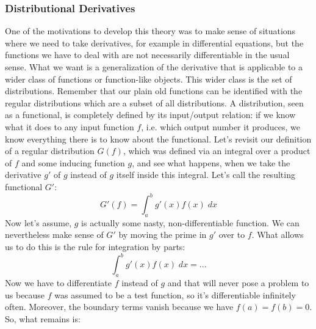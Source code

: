 \subsubsection{Distributional Derivatives}
One of the motivations to develop this theory was to make sense of situations where we need to take derivatives, for example in differential equations, but the functions we have to deal with are not necessarily differentiable in the usual sense. What we want is a generalization of the derivative that is applicable to a wider class of functions or function-like objects. This wider class is the set of distributions. Remember that our plain old functions can be identified with the regular distributions which are a subset of all distributions. A distribution, seen as a functional, is completely defined by its input/output relation: if we know what it does to any input function $f$, i.e. which output number it produces, we know everything there is to know about the functional. Let's revisit our definition of a regular distribution $G(f)$, which was defined via an integral over a product of $f$ and some inducing function $g$, and see what happens, when we take the derivative $g'$ of $g$ instead of $g$ itself inside this integral. Let's call the resulting functional $G'$:
\begin{equation}
 G'(f) = \int_a^b g'(x) f(x) \; dx
\end{equation}
Now let's assume, $g$ is actually some nasty, non-differentiable function. We can nevertheless make sense of $G'$ by moving the prime in $g'$ over to $f$. What allows us to do this is the rule for integration by parts:
\begin{equation}
 \int_a^b g'(x) f(x) \; dx = ...
\end{equation}
Now we have to differentiate $f$ instead of $g$ and that will never pose a problem to us because $f$ was assumed to be a test function, so it's differentiable infinitely often. Moreover, the boundary terms vanish because we have $f(a) = f(b) = 0$. So, what remains is:


\begin{comment}

-dual space: set of all linear maps from agivne space into the (real) numbers

https://en.wikipedia.org/wiki/Lebesgue_integration
https://de.wikipedia.org/wiki/Lebesgue-Integral

https://en.wikipedia.org/wiki/Distribution_(mathematics)
https://en.wikipedia.org/wiki/Bump_function
https://en.wikipedia.org/wiki/Mollifier

https://www.math.arizona.edu/~kglasner/math456/GREENS1.pdf

\end{comment}